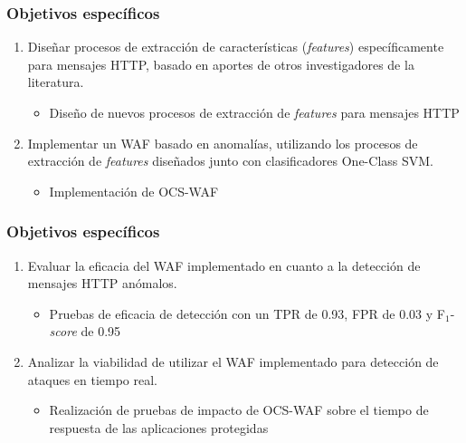 \begin{frame}
    \frametitle{Objetivos específicos}

    \begin{enumerate}[<+(1)->]
        \item
        Diseñar procesos de extracción de características (\textit{features})
        específicamente para mensajes HTTP, basado en aportes de otros
        investigadores de la literatura.

        \begin{itemize}[<.->]
            \item
            Diseño de nuevos procesos de extracción de \textit{features}
            para mensajes HTTP
        \end{itemize}

        \item
        Implementar un WAF basado en anomalías, utilizando los procesos de
        extracción de \textit{features} diseñados junto con clasificadores
        One-Class SVM.

        \begin{itemize}[<.->]
            \item
            Implementación de OCS-WAF
        \end{itemize}

        \savemynewenumi
    \end{enumerate}
\end{frame}

\begin{frame}
    \frametitle{Objetivos específicos}

    \begin{enumerate}[<+->]
        \contmynewenumi

        \item
        Evaluar la eficacia del WAF implementado en cuanto a la detección
        de mensajes HTTP anómalos.

        \begin{itemize}[<.->]
            \item
            Pruebas de eficacia de detección con un
            TPR de \num{0.93},
            FPR de \num{0.03} y
            F$_{1}$-\textit{score} de \num{0.95}
        \end{itemize}

        \item
        Analizar la viabilidad de utilizar el WAF implementado para
        detección de ataques en tiempo real.

        \begin{itemize}[<.->]
            \item
            Realización de pruebas de impacto de OCS-WAF sobre el tiempo
            de respuesta de las aplicaciones protegidas
        \end{itemize}
    \end{enumerate}
\end{frame}

